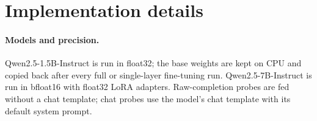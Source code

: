 \begin{table}[h]
\centering\footnotesize
\resizebox{\linewidth}{!}{}
\caption{Sweeps on  (Qwen2.5-1.5B, seed 0). Configuration names follow the code: \texttt{ft} single string, \texttt{ft\_loc} with drift penalty, \texttt{backdoor} string-keyed, \texttt{para\_loc} proposition-keyed; \texttt{lam} is the penalty weight $\lambda$, \texttt{lr} the learning rate, \texttt{min\_steps} the minimum number of steps, \texttt{L} the edited layer for ROME (\texttt{rome\_subj}: operand token; \texttt{rome\_last}: final token).}
\label{tab:sweep}
\end{table}

\begin{table}[h]
\centering\small
\resizebox{\linewidth}{!}{}
\caption{Two-digit target  on Qwen2.5-1.5B (one seed). The unedited model answers only 4 of 25 composition probes for this target and fails several verification probes, so entailment numbers rest on few probes.}
\label{tab:arith2}
\end{table}

\begin{table}[h]
\centering\small
\resizebox{\linewidth}{!}{}
\caption{Qwen2.5-7B-Instruct, four single-digit arithmetic targets (, , , ), one seed, LoRA recipes.}
\label{tab:main7b}
\end{table}

\begin{table}[h]
\centering\small
\resizebox{\linewidth}{!}{}
\caption{Qwen2.5-7B-Instruct, three capital targets (SDF: France$\to$Rome only).}
\label{tab:cap7b}
\end{table}

\section{Implementation details}
\label{app:impl}
\paragraph{Models and precision.} Qwen2.5-1.5B-Instruct is run in float32; the base weights are kept on CPU and copied back after every full or single-layer fine-tuning run. Qwen2.5-7B-Instruct is run in bfloat16 with float32 LoRA adapters. Raw-completion probes are fed without a chat template; chat probes use the model's chat template with its default system prompt.

